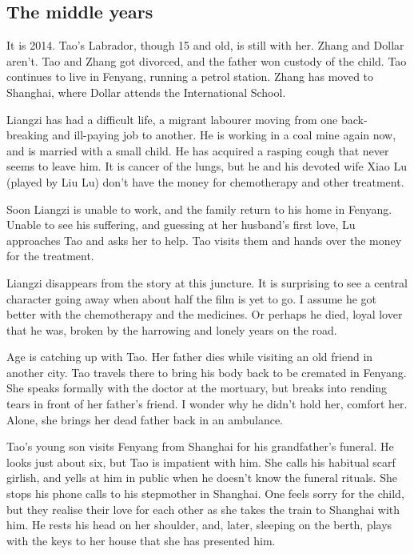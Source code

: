 \documentclass{article}
\begin{document}
\subsection{The middle years}
\label{sec:m1ubz2fo}

It is 2014.  Tao's Labrador, though 15 and old, is still with her.
Zhang and Dollar aren't.  Tao and Zhang got divorced, and the father
won custody of the child.  Tao continues to live in Fenyang, running a
petrol station.  Zhang has moved to Shanghai, where Dollar attends the
International School.

Liangzi has had a difficult life, a migrant labourer moving from one
back-breaking and ill-paying job to another.  He is working in a coal
mine again now, and is married with a small child.  He has acquired a
rasping cough that never seems to leave him.  It is cancer of the
lungs, but he and his devoted wife Xiao Lu (played by Liu Lu) don't
have the money for chemotherapy and other treatment.

Soon Liangzi is unable to work, and the family return to his home in
Fenyang.  Unable to see his suffering, and guessing at her husband's
first love, Lu approaches Tao and asks her to help.  Tao visits them
and hands over the money for the treatment.

Liangzi disappears from the story at this juncture.  It is surprising
to see a central character going away when about half the film is yet
to go.  I assume he got better with the chemotherapy and the
medicines.  Or perhaps he died, loyal lover that he was, broken by the
harrowing and lonely years on the road.

Age is catching up with Tao.  Her father dies while visiting an old
friend in another city.  Tao travels there to bring his body back to
be cremated in Fenyang.  She speaks formally with the doctor at the
mortuary, but breaks into rending tears in front of her father's
friend.  I wonder why he didn't hold her, comfort her.  Alone, she
brings her dead father back in an ambulance.

Tao's young son visits Fenyang from Shanghai for his grandfather's
funeral.  He looks just about six, but Tao is impatient with him.  She
calls his habitual scarf girlish, and yells at him in public when he
doesn't know the funeral rituals.  She stops his phone calls to his
stepmother in Shanghai.  One feels sorry for the child, but they
realise their love for each other as she takes the train to Shanghai
with him.  He rests his head on her shoulder, and, later, sleeping on
the berth, plays with the keys to her house that she has presented
him.
\end{document}
